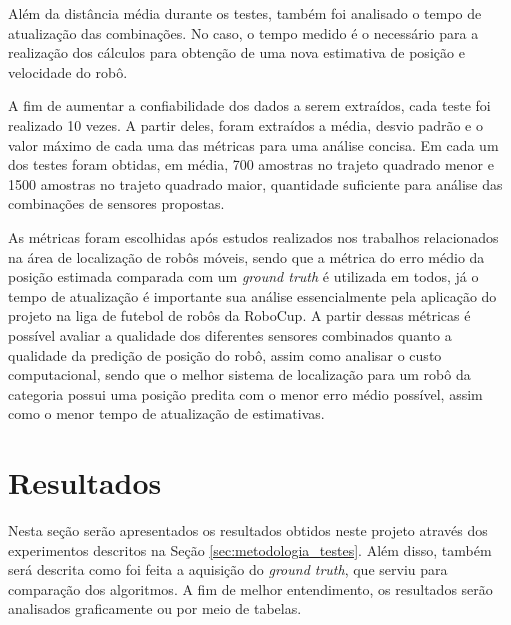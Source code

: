 \documentclass[acronym, symbols, table]{fei}
\begin{document}
		Além da distância média durante os testes, também foi analisado o tempo de atualização das combinações. No caso, o tempo medido é o necessário para a realização dos cálculos para obtenção de uma nova estimativa de posição e velocidade do robô.
		
		
		A fim de aumentar a confiabilidade dos dados a serem extraídos, cada teste foi realizado 10 vezes. A partir deles, foram extraídos a média, desvio padrão e o valor máximo de cada uma das métricas para uma análise concisa. Em cada um dos testes foram obtidas, em média, 700 amostras no trajeto quadrado menor e 1500 amostras no trajeto quadrado maior, quantidade suficiente para análise das combinações de sensores propostas.
		
		As métricas foram escolhidas após estudos realizados nos trabalhos relacionados na área de localização de robôs móveis, sendo que a métrica do erro médio da posição estimada comparada com um \textit{ground truth} é utilizada em todos, já o tempo de atualização é importante sua análise essencialmente pela aplicação do projeto na liga de futebol de robôs  da RoboCup. A partir dessas métricas é possível avaliar a qualidade dos diferentes sensores combinados quanto a qualidade da predição de posição do robô, assim como analisar o custo computacional, sendo que o melhor sistema de localização para um robô da categoria  possui uma posição predita com o menor erro médio possível, assim como o menor tempo de atualização de estimativas.
		
	\chapter{Resultados} \label{sec:resultados}
	
		Nesta seção serão apresentados os resultados obtidos neste projeto através dos experimentos descritos na Seção \ref{sec:metodologia_testes}. Além disso, também será descrita como foi feita a aquisição do \textit{ground truth}, que serviu para comparação dos algoritmos. A fim de melhor entendimento, os resultados serão analisados graficamente ou por meio de tabelas.
		
\end{document}
